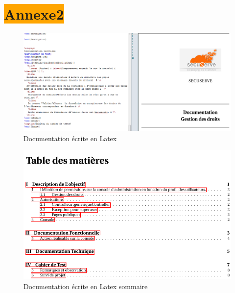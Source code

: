 \section{\colorbox{orange}{Annexe2}}
\label{documentation}
\begin{figure}[!h]
\begin{center}
\includegraphics[width=15cm]{image/code_doc_tex.png}
\end{center}
\caption{Documentation écrite en Latex}
\end{figure}


\begin{figure}[!h]
\begin{center}
\includegraphics[width=15cm]{image/doc_somma.png}
\end{center}
\caption{Documentation écrite en Latex sommaire}
\end{figure}